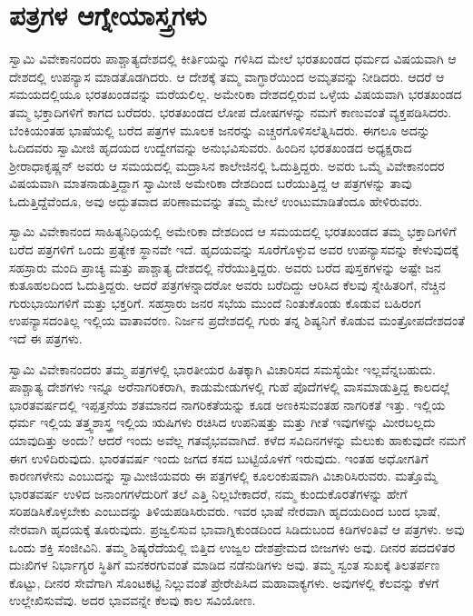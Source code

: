 
\chapter{ಪತ್ರಗಳ ಆಗ್ನೇಯಾಸ್ತ್ರಗಳು}

 ಸ್ವಾಮಿ ವಿವೇಕಾನಂದರು ಪಾಶ್ಚಾತ್ಯದೇಶದಲ್ಲಿ ಕೀರ್ತಿಯನ್ನು ಗಳಿಸಿದ ಮೇಲೆ ಭರತಖಂಡದ ಧರ್ಮದ ವಿಷಯವಾಗಿ ಆ ದೇಶದಲ್ಲಿ ಉಪನ್ಯಾಸ ಮಾಡತೊಡಗಿದರು. ಆ ದೇಶಕ್ಕೆ ತಮ್ಮ ವಾಗ್ಧಾರೆಯಿಂದ ಅಮೃತವನ್ನು ನೀಡಿದರು. ಆದರೆ ಆ ಸಮಯದಲ್ಲಿಯೂ ಭರತಖಂಡವನ್ನು ಮರೆಯಲಿಲ್ಲ. ಅಮೇರಿಕಾ ದೇಶದಲ್ಲಿರುವ ಒಳ್ಳೆಯ ವಿಷಯವಾಗಿ ಭರತಖಂಡದ ತಮ್ಮ ಭಕ್ತಾದಿಗಳಿಗೆ ಕಾಗದ ಬರೆದರು. ಭರತಖಂಡದ ಲೋಪ ದೋಷಗಳನ್ನು ನಮಗೆ ಕಾಣುವಂತೆ ವ್ಯಕ್ತಪಡಿಸಿದರು. ಬೆಂಕಿಯಂತಹ ಭಾಷೆಯಲ್ಲಿ ಬರೆದ ಪತ್ರಗಳ ಮೂಲಕ ಜನರನ್ನು ಎಚ್ಚರಗೊಳಿಸಲೆತ್ನಿಸಿದರು. ಈಗಲೂ ಅದನ್ನು ಓದಿದವರು ಸ್ವಾಮೀಜಿ ಹೃದಯದ ಉದ್ವೇಗವನ್ನು ಅನುಭವಿಸುವರು. ಹಿಂದಿನ ಭರತಖಂಡದ ಅಧ್ಯಕ್ಷರಾದ ಶ‍್ರೀ‌ರಾಧಾಕೃಷ್ಣನ್ ಅವರು ಆ ಸಮಯದಲ್ಲಿ ಮದ್ರಾಸಿನ ಕಾಲೇಜಿನಲ್ಲಿ ಓದುತ್ತಿದ್ದರು. ಅವರು ಒಮ್ಮೆ ವಿವೇಕಾನಂದರ ವಿಷಯವಾಗಿ ಮಾತನಾಡುತ್ತಿದ್ದಾಗ ಸ್ವಾಮೀಜಿ ಅಮೇರಿಕಾ ದೇಶದಿಂದ ಬರೆಯುತ್ತಿದ್ದ ಆ ಪತ್ರಗಳನ್ನು ತಾವು ಓದುತ್ತಿದ್ದೆವೆಂದೂ, ಅವು ಅದ್ಭುತವಾದ ಪರಿಣಾಮವನ್ನು ತಮ್ಮ ಮೇಲೆ ಉಂಟುಮಾಡಿತೆಂದೂ ಹೇಳಿರುವರು. 

 ಸ್ವಾಮಿ ವಿವೇಕಾನಂದ ಸಾಹಿತ್ಯನಿಧಿಯಲ್ಲಿ ಅಮೇರಿಕಾ ದೇಶದಿಂದ ಆ ಸಮಯದಲ್ಲಿ ಭರತಖಂಡದ ತಮ್ಮ ಭಕ್ತಾದಿಗಳಿಗೆ ಬರೆದ ಪತ್ರಗಳಿಗೆ ಒಂದು ಪ್ರತ್ಯೇಕ ಸ್ಥಾನವೇ ಇದೆ. ಹೃದಯವನ್ನು ಸೂರೆಗೊಳ್ಳುವ ಅವರ ಉಪನ್ಯಾಸವನ್ನು ಕೇಳುವುದಕ್ಕೆ ಸಹಸ್ರಾರು ಮಂದಿ ಪ್ರಾಚ್ಯ ಮತ್ತು ಪಾಶ್ಚಾತ್ಯ ದೇಶದಲ್ಲಿ ನೆರೆಯುತ್ತಿದ್ದರು. ಅವರು ಬರೆದ ಪುಸ್ತಕಗಳನ್ನು ಅಷ್ಟೇ ಜನ ಕುತೂಹಲದಿಂದ ಓದುತ್ತಿದ್ದರು. ಆದರೆ ಪತ್ರಗಳನ್ನಾದರೋ ‌ಅವರು ಬರೆದಿದ್ದು ಆರಿಸಿದ ಕೆಲವು ಸ್ನೇಹಿತರಿಗೆ, ನೆಚ್ಚಿನ ಗುರುಭಾಯಿಗಳಿಗೆ ಮತ್ತು ಭಕ್ತರಿಗೆ. ಸಹಸ್ರಾರು ಜನರ ಸಭೆಯ ಮುಂದೆ ನಿಂತುಕೊಂಡು ಕೊಡುವ ಬಹಿರಂಗ ಉಪನ್ಯಾಸದಂತಿಲ್ಲ ಇಲ್ಲಿಯ ವಾತಾವರಣ. ನಿರ್ಜನ ಪ್ರದೇಶದಲ್ಲಿ ಗುರು ತನ್ನ ಶಿಷ್ಯನಿಗೆ ಕೊಡುವ ಮಂತ್ರೋಪದೇಶದಂತೆ ಇದೆ ಈ ಪತ್ರಗಳು. 

 ಸ್ವಾಮಿ ವಿವೇಕಾನಂದರು ತಮ್ಮ ಪತ್ರಗಳಲ್ಲಿ ಭಾರತೀಯರ ಹಿತಕ್ಕಾಗಿ ವಿಚಾರಿಸದ ಸಮಸ್ಯೆಯೇ ಇಲ್ಲವೆನ್ನಬಹುದು. ಪಾಶ್ಚಾತ್ಯ ದೇಶಗಳು ಇನ್ನೂ ಅರೆನಾಗರಿಕರಾಗಿ, ಕಾಡುಮೇಡುಗಳಲ್ಲಿ ಗುಹೆ ಪೊದೆಗಳಲ್ಲಿ ವಾಸಮಾಡುತ್ತಿದ್ದ ಕಾಲದಲ್ಲೆ ಭಾರತವರ್ಷದಲ್ಲಿ ಇಪ್ಪತ್ತನೆಯ ಶತಮಾನದ ನಾಗರಿಕತೆಯನ್ನು ಕೂಡ ಅಣಕಿಸುವಂತಹ ನಾಗರಿಕತೆ ಇತ್ತು. ಇಲ್ಲಿಯ ಧರ್ಮ ಇಲ್ಲಿಯ ತತ್ತ್ವಶಾಸ್ತ್ರ ಇಲ್ಲಿಯ ಋಷಿಗಳು ರಚಿಸಿದ ಉಪನಿಷತ್ತು ಮತ್ತು ಗೀತೆ ಇವುಗಳನ್ನು ಮೀರಬಲ್ಲದು ಯಾವುದಿತ್ತು ಅಂದು? ಆದರೆ ಇಂದು ಅವೆಲ್ಲ ಗತವೈಭವವಾಗಿದೆ. ಕಳೆದ ಸವಿದಿನಗಳನ್ನು ಮೆಲುಕು ಹಾಕುವುದೇ ನಮಗೆ ಈಗ ಉಳಿದಿರುವುದು. ಭಾರತವರ್ಷ ಇಂದು ಜಗದ ಕಸದ ಬುಟ್ಟಿಯೊಳಗೆ ಇರುವುದು. ಇಂತಹ ಅಧೋಗತಿಗೆ ಕಾರಣಗಳೇನು ಎಂಬುದನ್ನು ಸ್ವಾಮೀಜಿಯವರು ಈ ಪತ್ರಗಳಲ್ಲಿ ಕೂಲಂಕುಷವಾಗಿ ವಿಚಾರಿಸಿರುವರು. ಮತ್ತೊಮ್ಮೆ ಭಾರತವರ್ಷ ಉಳಿದ ಜನಾಂಗಗಳೆದುರಿಗೆ ತಲೆ ಎತ್ತಿ ನಿಲ್ಲಬೇಕಾದರೆ, ನಮ್ಮ ಕುಂದುಕೊರತೆಗಳನ್ನು ಹೇಗೆ ಸರಿಪಡಿಸಿಕೊಳ್ಳಬೇಕು ಎಂಬುದನ್ನು ತಿಳಿಯಪಡಿಸಿರುವರು. ಇವರ ಭಾಷೆ ನೇರವಾಗಿ ಹೃದಯದಿಂದ ಬಂದ ಭಾಷೆ, ನೇರವಾಗಿ ಹೃದಯಕ್ಕೆ ತೂರುವುದು. ಪ್ರಜ್ವಲಿಸುವ ಭಾವಾಗ್ನಿಕುಂಡದಿಂದ ಸಿಡಿದುಬಂದ ಕಿಡಿಗಳಂತಿವೆ ಆ ಪತ್ರಗಳು. ಅವು ಒಂದು ಶಕ್ತಿ ಸಂಜೀವಿನಿ. ತಮ್ಮ ಶಿಷ್ಯರೆದೆಯಲ್ಲಿ ಬಿತ್ತಿದ ಉಜ್ವಲ ದೇಶಪ್ರೇಮದ ಬೀಜಗಳು ಅವು. ದೀನರ ಪದದಳಿತರ ದುಃಖಿಗಳ ನಿರ್ಭಾಗ್ಯರ ಸ್ಥಿತಿಗೆ ಮನಕರಗುವಂತೆ ಮಾಡಿದ ನಡೆನುಡಿಗಳು ಅವು. ತಮ್ಮ ಸ್ವಂತ ಸುಖಕ್ಕೆ ತಿಲತರ್ಪಣ ಕೊಟ್ಟು, ದೀನರ ಸೇವೆಗಾಗಿ ಸೊಂಟಕಟ್ಟಿ ನಿಲ್ಲುವಂತೆ ಪ್ರೇರೇಪಿಸಿದ ಮಹಾವಾಕ್ಯಗಳು. ಅವುಗಳಲ್ಲಿ ಕೆಲವನ್ನು ಕೆಳಗೆ ಉಲ್ಲೇಖಿಸುವೆವು. ಅದರ ಭಾವವನ್ನೇ ಕೆಲವು ಕಾಲ ಸವಿಯೋಣ. 

